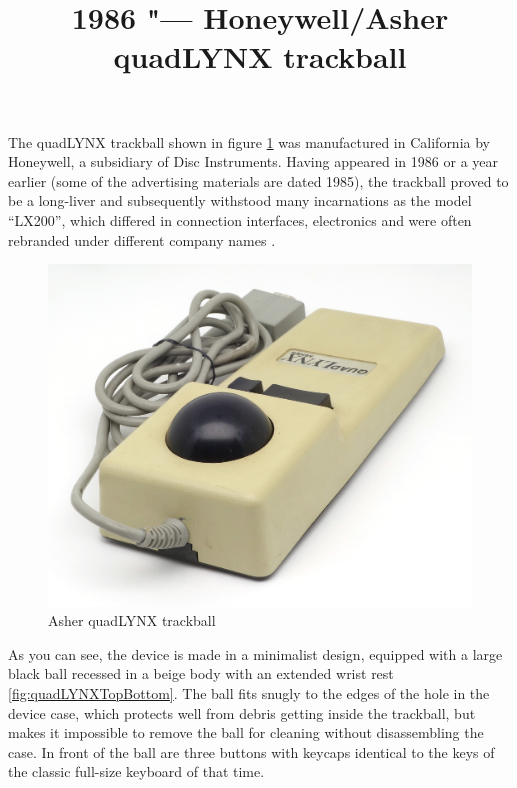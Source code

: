 \documentclass[11pt, a4paper]{article}
\begin{document}
\title{1986 "--- Honeywell/Asher quadLYNX trackball}
\date{}
\maketitle
{}
The quadLYNX trackball shown in figure \ref{fig:quadLYNXPic} was manufactured in California by Honeywell, a subsidiary of Disc Instruments. Having appeared in 1986 or a year earlier (some of the advertising materials are dated 1985), the trackball proved to be a long-liver and subsequently withstood many incarnations as the model “LX200”, which differed in connection interfaces, electronics and were often rebranded under different company names \cite{lx200}.

\begin{figure}[h]
    \centering
    \includegraphics[scale=0.45]{1986_honeywell_asher_quadlynx_trackball/pic_30.jpg}
    \caption{Asher quadLYNX trackball}
    \label{fig:quadLYNXPic}
\end{figure}

As you can see, the device is made in a minimalist design, equipped with a large black ball recessed in a beige body with an extended wrist rest \ref{fig:quadLYNXTopBottom}. The ball fits snugly to the edges of the hole in the device case, which protects well from debris getting inside the trackball, but makes it impossible to remove the ball for cleaning without disassembling the case. In front of the ball are three buttons with keycaps identical to the keys of the classic full-size keyboard of that time.
\end{document}
